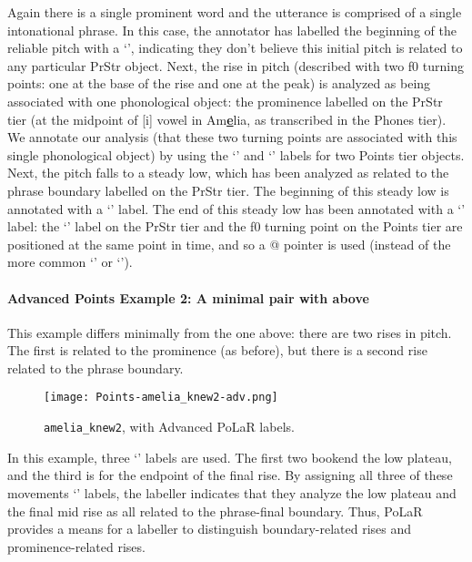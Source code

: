 Again there is a single prominent word and the utterance is comprised of a single intonational phrase. In this case, the annotator has labelled the beginning of the reliable pitch with a ‘’, indicating they don’t believe this initial pitch is related to any particular PrStr object. Next, the rise in pitch (described with two f0 turning points: one at the base of the rise and one at the peak) is analyzed as being associated with one phonological object: the prominence labelled on the PrStr tier (at the midpoint of [i] vowel in Am\textbf{\uline{e}}lia, as transcribed in the Phones tier). We annotate our analysis (that these two turning points are associated with this single phonological object) by using the ‘\textlabel{*>}’ and ‘\textlabel{*<}’ labels for two Points tier objects. Next, the pitch falls to a steady low, which has been analyzed as related to the phrase boundary labelled on the PrStr tier. The beginning of this steady low is annotated with a ‘\textlabel{]>}’ label. The end of this steady low has been annotated with a ‘\textlabel{]@}’ label: the ‘\textlabel{]}’ label on the PrStr tier and the f0 turning point on the Points tier are positioned at the same point in time, and so a @ pointer is used (instead of the more common ‘\textlabel{>}’ or ‘\textlabel{<}’).

\paragraph{Advanced Points Example 2: A minimal pair with above}
This example differs minimally from the one above: there are two rises in pitch. The first is related to the prominence (as before), but there is a second rise related to the phrase boundary.

\begin{figure}[H]
\centering
%
\texttt{[image: Points-amelia\_knew2-adv.png]}
%
\caption{\texttt{amelia\_knew2}, with Advanced PoLaR labels.%
\label{fig:amelia_knew2 Points Adv}%
}
\end{figure}

In this example, three ‘\textlabel{]>}’ labels are used. The first two bookend the low plateau, and the third is for the endpoint of the final rise. By assigning all three of these movements ‘\textlabel{]>}’ labels, the labeller indicates that they analyze the low plateau and the final mid rise as all related to the phrase-final boundary. Thus, PoLaR provides a means for a labeller to distinguish boundary-related rises and prominence-related rises.

